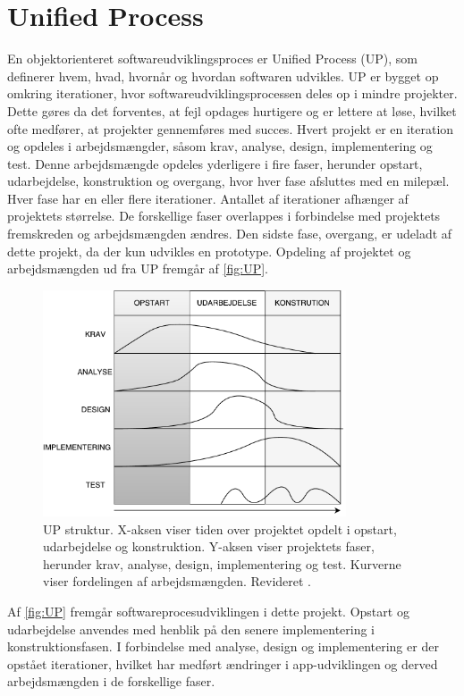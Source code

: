 \section{Unified Process} \label{sec:UP}
En objektorienteret softwareudviklingsproces er Unified Process (UP), som definerer hvem, hvad, hvornår og hvordan softwaren udvikles. UP er bygget op omkring iterationer, hvor softwareudviklingsprocessen deles op i mindre projekter. Dette gøres da det forventes, at fejl opdages hurtigere og er lettere at løse, hvilket ofte medfører, at projekter gennemføres med succes. Hvert projekt er en iteration og opdeles i arbejdsmængder, såsom krav, analyse, design, implementering og test. Denne arbejdsmængde opdeles yderligere i fire faser, herunder opstart, udarbejdelse, konstruktion og overgang, hvor hver fase afsluttes med en milepæl. Hver fase har en eller flere iterationer. Antallet af iterationer afhænger af projektets størrelse. De forskellige faser overlappes i forbindelse med projektets fremskreden og arbejdsmængden ændres.\cite{Arlow2002}  Den sidste fase, overgang, er udeladt af dette projekt, da der kun udvikles en prototype. Opdeling af projektet og arbejdsmængden ud fra UP fremgår af \autoref{fig:UP}.

\begin{figure} [H]
\centering
\includegraphics[width=0.8\textwidth]{figures/UP}
\caption{UP struktur. X-aksen viser tiden over projektet opdelt i opstart, udarbejdelse og konstruktion. Y-aksen viser projektets faser, herunder krav, analyse, design, implementering og test. Kurverne viser fordelingen af arbejdsmængden. Revideret \cite{Arlow2002}.}
\label{fig:UP}
\end{figure} 

\noindent
Af \autoref{fig:UP} fremgår softwareprocesudviklingen i dette projekt. Opstart og udarbejdelse anvendes med henblik på den senere implementering i konstruktionsfasen. I forbindelse med analyse, design og implementering er der opstået iterationer, hvilket har medført ændringer i app-udviklingen og derved arbejdsmængden i de forskellige faser. 



